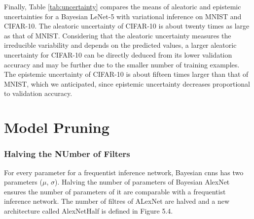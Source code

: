 \newline Finally, Table \ref{tab:uncertainty} compares the means of aleatoric and epistemic uncertainties for a Bayesian LeNet-5 with variational inference on MNIST and CIFAR-10. The aleatoric uncertainty of CIFAR-10 is about twenty times as large as that of MNIST. Considering that the aleatoric uncertainty measures the irreducible variability and depends on the predicted values, a larger aleatoric uncertainty for CIFAR-10 can be directly deduced from its lower validation accuracy and may be further due to the smaller number of training examples. The epistemic uncertainty of CIFAR-10 is about fifteen times larger than that of MNIST, which we anticipated, since epistemic uncertainty decreases proportional to validation accuracy. 
\begin{table}[t!]
\tiny
    \centering
    \renewcommand{\arraystretch}{1.5}
    \renewcommand{\arraystretch}{1.5}
    \caption{Aleatoric and epistemic uncertainty for Bayesian LeNet-5 calculated for MNIST and CIFAR-10, computed as proposed by Kwon et al. \cite{kwon2018uncertainty}.}
    \label{tab:uncertainty}
\end{table}

\section{Model Pruning}

\subsubsection{Halving the NUmber of Filters}

For every parameter for a frequentist inference network, Bayesian \acp{cnn} has two parameters ($\mu$, $\sigma$). Halving the number of parameters of Bayesian AlexNet ensures the number of parameters of it are comparable with a frequentist inference network. The number of filtres of ALexNet are halved and a new architecture called AlexNetHalf is defined in Figure 5.4. 

